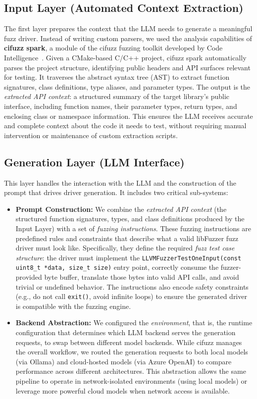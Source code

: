 \subsection{Input Layer (Automated Context Extraction)}
\label{sec:input_layer}
The first layer prepares the context that the LLM needs to generate a meaningful fuzz driver. Instead of writing custom parsers, we used the analysis capabilities of \textbf{cifuzz spark}, a module of the cifuzz fuzzing toolkit developed by Code Intelligence~\cite{cifuzzspark}. Given a CMake-based C/C++ project, cifuzz spark automatically parses the project structure, identifying public headers and API surfaces relevant for testing. It traverses the abstract syntax tree (AST) to extract function signatures, class definitions, type aliases, and parameter types. The output is the \emph{extracted API context}: a structured summary of the target library's public interface, including function names, their parameter types, return types, and enclosing class or namespace information. This ensures the LLM receives accurate and complete context about the code it needs to test, without requiring manual intervention or maintenance of custom extraction scripts.

\subsection{Generation Layer (LLM Interface)}
\label{sec:gen_layer}
This layer handles the interaction with the LLM and the construction of the prompt that drives driver generation. It includes two critical sub-systems:
\begin{itemize}
    \item \textbf{Prompt Construction:} We combine the \emph{extracted API context} (the structured function signatures, types, and class definitions produced by the Input Layer) with a set of \emph{fuzzing instructions}. These fuzzing instructions are predefined rules and constraints that describe what a valid libFuzzer fuzz driver must look like. Specifically, they define the required \emph{fuzz test case structure}: the driver must implement the \texttt{LLVMFuzzerTestOneInput(const uint8\_t *data, size\_t size)} entry point, correctly consume the fuzzer-provided byte buffer, translate those bytes into valid API calls, and avoid trivial or undefined behavior. The instructions also encode safety constraints (e.g., do not call \texttt{exit()}, avoid infinite loops) to ensure the generated driver is compatible with the fuzzing engine.

    \item \textbf{Backend Abstraction:} We configured the \emph{environment}, that is, the runtime configuration that determines which LLM backend serves the generation requests, to swap between different model backends. While cifuzz manages the overall workflow, we routed the generation requests to both local models (via Ollama) and cloud-hosted models (via Azure OpenAI) to compare performance across different architectures. This abstraction allows the same pipeline to operate in network-isolated environments (using local models) or leverage more powerful cloud models when network access is available.
\end{itemize}

